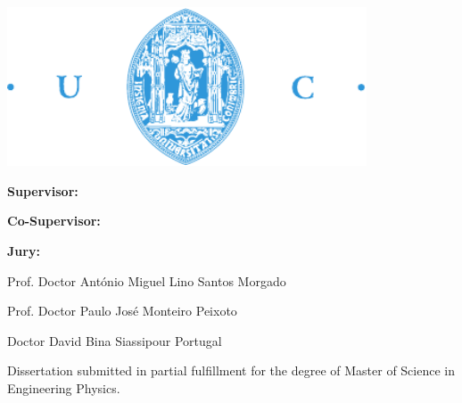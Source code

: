\begin{titlepage}
\begin{center}
\includegraphics[width=0.8\textwidth]{images/fctuc.pdf}

\vspace{1cm}
{\huge{\textbf{\thesistitle}}\par}

\vspace{1cm}
{\large{\textbf{Supervisor:}\\\supervisorname\par}}
\vspace{5mm}
{\large{\textbf{Co-Supervisor:}\\\cosupervisorname}}

\vspace{1cm}
{\large{\textbf{Jury:}

Prof. Doctor António Miguel Lino Santos Morgado

Prof. Doctor Paulo José Monteiro Peixoto 

Doctor David Bina Siassipour Portugal 

}}

\vfill
Dissertation submitted in partial fulfillment for the degree of Master of Science in Engineering Physics.

\vspace{0.5cm}
{\large \statedate\par}    


\end{center}
\end{titlepage}